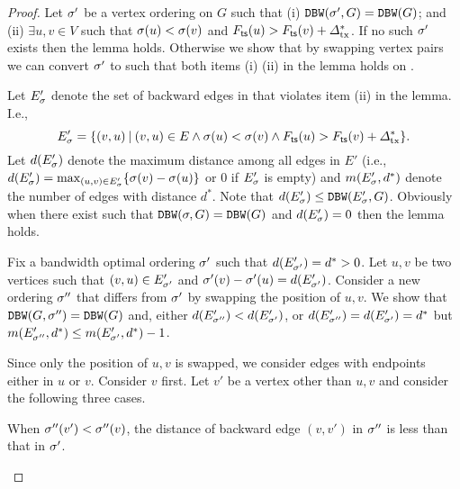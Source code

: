 \begin{proof}
    Let $\sigma'$ be a vertex ordering on $G$ such that (i) $\mathtt{DBW}(\sigma', G) = \mathtt{DBW}(G)$; and (ii) $\exists u, v \in V$ such that $\sigma(u) < \sigma(v)$ and $F_{\mathsf{ts}}(u) > F_{\mathsf{ts}}(v) + \varDelta_{\mathrm{tx}}^*$.
    If no such $\sigma'$ exists then the lemma holds.
    Otherwise we show that by swapping vertex pairs we can convert $\sigma'$ to \orderOutput such that both items (i) (ii) in the lemma holds on \orderOutput.

    Let $E'_\sigma$ denote the set of backward edges in \orderOutput that violates item (ii) in the lemma.
    I.e.,
    \[ E'_\sigma = \{(v, u) \mathbin| (v, u) \in E \wedge \sigma(u) < \sigma(v) \wedge F_{\mathsf{ts}}(u) > F_{\mathsf{ts}}(v) + \varDelta_{\mathrm{tx}}^* \}. \]
    Let $d(E'_\sigma)$ denote the maximum distance among all edges in $E'$ (i.e., $d(E'_\sigma) = \max_{(u, v) \in E'_\sigma} \{\sigma(v) - \sigma(u)\}$ or $0$ if $E'_\sigma$ is empty) and $m(E'_\sigma, d^*)$ denote the number of edges with distance $d^*$.
    Note that $d(E'_\sigma) \le \mathtt{DBW}(E'_\sigma, G)$.
    Obviously when there exist \orderOutput such that $\mathtt{DBW}(\sigma, G) = \mathtt{DBW}(G)$ and $d(E'_\sigma) = 0$ then the lemma holds.

    Fix a bandwidth optimal ordering $\sigma'$ such that $d(E'_{\sigma'}) = d^* > 0$.
    Let $u, v$ be two vertices such that $(v, u) \in E'_{\sigma'}$ and $\sigma'(v) - \sigma'(u) = d(E'_{\sigma'})$.
    Consider a new ordering $\sigma''$ that differs from $\sigma'$ by swapping the position of $u ,v$.
    We show that $\mathtt{DBW}(G, \sigma'') = \mathtt{DBW}(G)$ and, either $d(E'_{\sigma''}) < d(E'_{\sigma'})$, or $d(E'_{\sigma''}) = d(E'_{\sigma'}) = d^*$ but $m(E'_{\sigma''}, d^*) \le m(E'_{\sigma'}, d^*) - 1$.

    Since only the position of $u, v$ is swapped, we consider edges with
    endpoints either in $u$ or $v$.
    Consider $v$ first.
    Let $v'$ be a vertex other than $u, v$ and consider the following three
    cases.

    \begin{cccItemize}[nosep]
        \item When $\sigma''(v') < \sigma''(v)$, the distance of backward edge $(v, v')$ in $\sigma''$ is less than that in $\sigma'$.


\end{cccItemize}
\end{proof}

